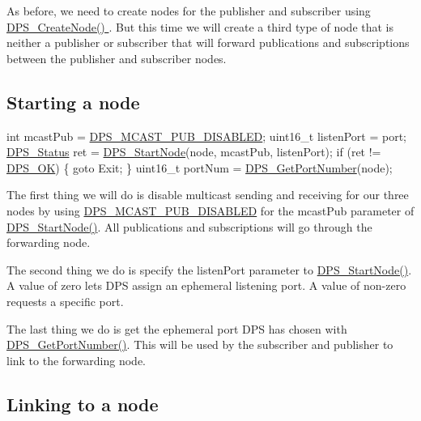 As before, we need to create nodes for the publisher and subscriber using \hyperlink{tutorials-hello-world_creating-a-node}{D\+P\+S\+\_\+\+Create\+Node() }. But this time we will create a third type of node that is neither a publisher or subscriber that will forward publications and subscriptions between the publisher and subscriber nodes.\hypertarget{tutorials-link_starting-a-unicast-node}{}\subsection{Starting a node}\label{tutorials-link_starting-a-unicast-node}

\begin{DoxyCodeInclude}
    \textcolor{keywordtype}{int} mcastPub = \hyperlink{group__node_gac939c83361ed89086f37c78d9c9009dd}{DPS\_MCAST\_PUB\_DISABLED};
    uint16\_t listenPort = port;
    \hyperlink{group__status_ga30395a84d3cad9d4ec29848106415038}{DPS\_Status} ret = \hyperlink{group__node_ga160d504bfaeb0d3711e0259000340fe3}{DPS\_StartNode}(node, mcastPub, listenPort);
    \textcolor{keywordflow}{if} (ret != \hyperlink{group__status_ga0ea3dd37bc558859ae0cb5a4f79a4bdd}{DPS\_OK}) \{
        \textcolor{keywordflow}{goto} Exit;
    \}
    uint16\_t portNum = \hyperlink{group__node_gaf920b28fe0721a7f97b11673494d7b36}{DPS\_GetPortNumber}(node);
\end{DoxyCodeInclude}
 The first thing we will do is disable multicast sending and receiving for our three nodes by using \hyperlink{group__node_gac939c83361ed89086f37c78d9c9009dd}{D\+P\+S\+\_\+\+M\+C\+A\+S\+T\+\_\+\+P\+U\+B\+\_\+\+D\+I\+S\+A\+B\+L\+ED} for the {\ttfamily mcast\+Pub} parameter of \hyperlink{group__node_ga160d504bfaeb0d3711e0259000340fe3}{D\+P\+S\+\_\+\+Start\+Node()}. All publications and subscriptions will go through the forwarding node.

The second thing we do is specify the {\ttfamily listen\+Port} parameter to \hyperlink{group__node_ga160d504bfaeb0d3711e0259000340fe3}{D\+P\+S\+\_\+\+Start\+Node()}. A value of zero lets D\+PS assign an ephemeral listening port. A value of non-\/zero requests a specific port.

The last thing we do is get the ephemeral port D\+PS has chosen with \hyperlink{group__node_gaf920b28fe0721a7f97b11673494d7b36}{D\+P\+S\+\_\+\+Get\+Port\+Number()}. This will be used by the subscriber and publisher to link to the forwarding node.\hypertarget{tutorials-link_linking}{}\subsection{Linking to a node}\label{tutorials-link_linking}

